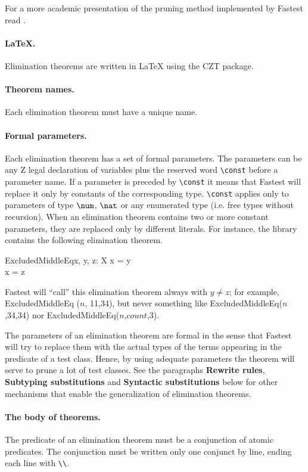 For a more academic presentation of the pruning method implemented by Fastest read \cite{CristiaARM}.

\paragraph{\LaTeX.} Elimination theorems are written in \LaTeX{} using the CZT package.

\paragraph{Theorem names.} Each elimination theorem must have a unique name.

\paragraph{Formal parameters.} Each elimination theorem has a set of formal parameters. The parameters can be any Z legal declaration of variables plus the reserved word \verb+\const+ before a parameter name. If a parameter is preceded by \verb+\const+ it means that Fastest will replace it only by constants of the corresponding type. \verb+\const+ applies only to parameters of type $\num$, $\nat$ or any enumerated type (i.e. free types without recursion). When an elimination theorem contains two or more constant parameters, they are replaced only by different literals. For instance, the library contains the following elimination theorem.

\begin{theorem}{ExcludedMiddleEq}{x, \const y, \const z: X}
x = y \\
x = z \\
\end{theorem}

Fastest will ``call'' this elimination theorem always with $y \neq z$; for example, ExcludedMiddleEq ($n$, 11,34), but never something like ExcludedMiddleEq($n$,34,34) nor ExcludedMiddleEq($n$,$count$,3).

The parameters of an elimination theorem are formal in the sense that Fastest will try to replace them with the actual types of the terms appearing in the predicate of a test class. Hence, by using adequate parameters the theorem will serve to prune a lot of test classes. See the paragraphs {\bf Rewrite rules}, {\bf Subtyping substitutions} and {\bf Syntactic substitutions} below for other mechanisms that enable the generalization of elimination theorems.

\paragraph{The body of theorems.} The predicate of an elimination theorem must be a conjunction of atomic predicates. The conjunction must be written only one conjunct by line, ending each line with \verb+\\+.

